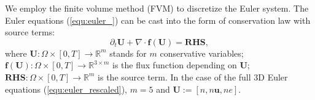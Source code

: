 \documentclass{article}
\begin{document}
We employ the finite volume method (FVM) to discretize the Euler system. The Euler
equations (\ref{equ:euler_}) can be cast into the form of conservation law with source
terms:
\begin{equation} \label{equ:euler_conservation}
    \partial_t \mathbf{U} + \nabla \cdot \mathbf{f}(\mathbf{U}) = \mathbf{RHS},
\end{equation}
where $\mathbf{U} : \Omega \times [0,T] \rightarrow \mathbb{R}^m$ stands for $m$
conservative variables;
$\mathbf{f}(\mathbf{U}) : \Omega \times [0,T] \rightarrow \mathbb{R}^{3 \times m}$ is the flux
function depending on $\mathbf{U}$; $\mathbf{RHS} : \Omega \times [0,T] \rightarrow \mathbb{R}^m$ is the source
term. In the case of the full 3D Euler equations (\ref{equ:euler_rescaled}), $m = 5$ and
$\mathbf{U} := [n, n\mathbf{u}, ne]$.
\end{document}
